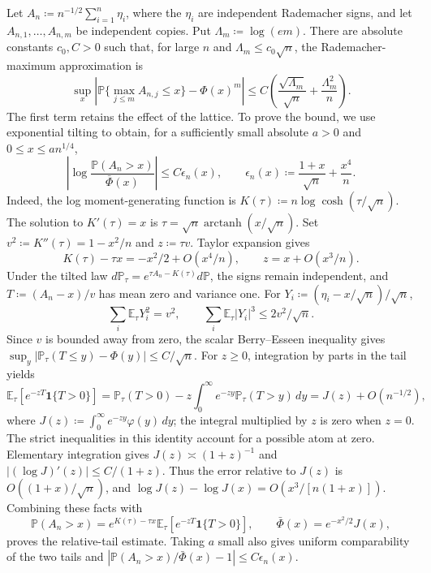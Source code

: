 \documentclass[11pt,letterpaper]{article}
\theoremstyle{remark}
\newcommand{\E}{\mathbb E}
\newcommand{\Pp}{\mathbb P}
\newcommand{\ind}{\mathbf 1}
\newcommand{\dd}{\,d}
\begin{document}
Let \(A_n\coloneqq n^{-1/2}\sum_{i=1}^n\eta_i\), where the
\(\eta_i\) are independent Rademacher signs, and let
\(A_{n,1},\ldots,A_{n,m}\) be independent copies. Put
\(\Lambda_m\coloneqq\log(em)\). There are absolute constants
\(c_0,C>0\) such that, for large \(n\) and
\(\Lambda_m\le c_0\sqrt n\), the Rademacher-maximum approximation is
\begin{equation}
 \sup_x\left|\Pp\{\max_{j\le m}A_{n,j}\le x\}-\Phi(x)^m\right|
 \le C\left(\frac{\sqrt{\Lambda_m}}{\sqrt n}
                 +\frac{\Lambda_m^2}{n}\right).
 \label{sym:eq:rademacher-max}
\end{equation}
The first term retains the effect of the lattice. To prove the bound,
we use exponential tilting to obtain, for a sufficiently small
absolute \(a>0\) and \(0\le x\le an^{1/4}\),
\[
 \left|\log\frac{\Pp(A_n>x)}{\bar\Phi(x)}\right|
 \le C\epsilon_n(x),\qquad
 \epsilon_n(x)\coloneqq\frac{1+x}{\sqrt n}+\frac{x^4}{n}.
\]
Indeed, the log moment-generating function is
\(K(\tau)\coloneqq n\log\cosh(\tau/\sqrt n)\). The solution to
\(K'(\tau)=x\) is \(\tau=\sqrt n\operatorname{arctanh}(x/\sqrt n)\).
Set \(v^2\coloneqq K''(\tau)=1-x^2/n\) and \(z\coloneqq\tau v\).
Taylor expansion gives
\[
 K(\tau)-\tau x=-x^2/2+O(x^4/n),
 \qquad z=x+O(x^3/n).
\]
Under the tilted law
\(d\Pp_\tau=e^{\tau A_n-K(\tau)}d\Pp\), the signs remain
independent, and \(T\coloneqq(A_n-x)/v\) has mean zero and variance
one. For \(Y_i\coloneqq(\eta_i-x/\sqrt n)/\sqrt n\),
\[
 \sum_i\E_\tau Y_i^2=v^2,
 \qquad \sum_i\E_\tau|Y_i|^3\le2v^2/\sqrt n.
\]
Since \(v\) is bounded away from zero, the scalar Berry--Esseen
inequality gives \(\sup_y|\Pp_\tau(T\le y)-\Phi(y)|\le C/\sqrt n\).
For \(z\ge0\), integration by parts in the tail yields
\[
 \E_\tau[e^{-zT}\ind\{T>0\}]
 =\Pp_\tau(T>0)-z\int_0^\infty e^{-zy}\Pp_\tau(T>y)\dd y
 =J(z)+O(n^{-1/2}),
\]
where \(J(z)\coloneqq\int_0^\infty e^{-zy}\varphi(y)\dd y\);
the integral multiplied by \(z\) is zero when \(z=0\).
The strict inequalities in this identity account for a possible atom
at zero. Elementary integration gives
\(J(z)\asymp(1+z)^{-1}\) and
\(|(\log J)'(z)|\le C/(1+z)\). Thus the error relative to \(J(z)\)
is \(O((1+x)/\sqrt n)\), and
\(\log J(z)-\log J(x)=O(x^3/[n(1+x)])\). Combining these facts with
\[
 \Pp(A_n>x)=e^{K(\tau)-\tau x}
                \E_\tau[e^{-zT}\ind\{T>0\}],
 \qquad \bar\Phi(x)=e^{-x^2/2}J(x),
\]
proves the relative-tail estimate. Taking \(a\) small also gives
uniform comparability of the two tails and
\(|\Pp(A_n>x)/\bar\Phi(x)-1|\le C\epsilon_n(x)\).
\end{document}
